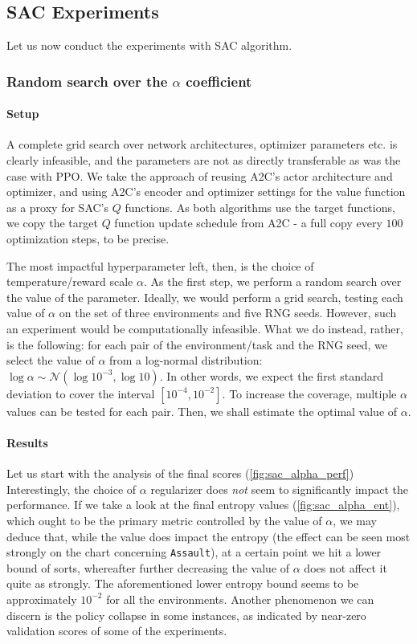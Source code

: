 \documentclass[en]{pracamgr}
\newcommand{\env}[1]{{\tt #1}}
\begin{document}
\subsection{SAC Experiments}

Let us now conduct the experiments with SAC algorithm.

\subsubsection{Random search over the $\alpha$ coefficient}

\paragraph{Setup} A complete grid search over network architectures, optimizer parameters etc. is clearly infeasible, and the parameters are not as directly transferable as was the case with PPO. We take the approach of reusing A2C's actor architecture and optimizer, and using A2C's encoder and optimizer settings for the value function as a proxy for SAC's $Q$ functions. As both algorithms use the target functions, we copy the target $Q$ function update schedule from A2C - a full copy every $100$ optimization steps, to be precise.

The most impactful hyperparameter left, then, is the choice of temperature/reward scale $\alpha$. As the first step, we perform a random search over the value of the parameter. Ideally, we would perform a grid search, testing each value of $\alpha$ on the set of three environments and five RNG seeds. However, such an experiment would be computationally infeasible. What we do instead, rather, is the following: for each pair of the environment/task and the RNG seed, we select the value of $\alpha$ from a log-normal distribution: $\log{\alpha} \sim \mathcal{N}(\log{10^{-3}}, \log{10})$. In other words, we expect the first standard deviation to cover the interval $[10^{-4}, 10^{-2}]$. To increase the coverage, multiple $\alpha$ values can be tested for each pair. Then, we shall estimate the optimal value of $\alpha$.

\paragraph{Results} Let us start with the analysis of the final scores (\autoref{fig:sac_alpha_perf}) Interestingly, the choice of $\alpha$ regularizer does \emph{not} seem to significantly impact the performance. If we take a look at the final entropy values (\autoref{fig:sac_alpha_ent}), which ought to be the primary metric controlled by the value of $\alpha$, we may deduce that, while the value does impact the entropy (the effect can be seen most strongly on the chart concerning \env{Assault}), at a certain point we hit a lower bound of sorts, whereafter further decreasing the value of $\alpha$ does not affect it quite as strongly. The aforementioned lower entropy bound seems to be approximately $10^{-2}$ for all the environments. Another phenomenon we can discern is the policy collapse in some instances, as indicated by near-zero validation scores of some of the experiments.
\end{document}
